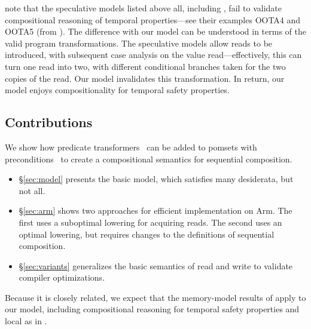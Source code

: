 \citet{DBLP:journals/pacmpl/JagadeesanJR20} note that the speculative models
listed above all, including \cite{DBLP:conf/popl/KangHLVD17}, fail to
validate compositional reasoning of temporal properties---see their examples
OOTA4 and OOTA5 (from \citep{DBLP:journals/toplas/Lochbihler13}).  The
difference with our model can be understood in terms of the valid program
transformations.  The speculative models allow reads to be introduced, with
subsequent case analysis on the value read---effectively, this can turn one
read into two, with different conditional branches taken for the two copies
of the read.  Our model invalidates this transformation.  In return, our
model enjoys compositionality for temporal safety properties.

\subsection{Contributions}

We show how predicate transformers~\cite{DBLP:journals/cacm/Dijkstra75} can
be added to pomsets with
preconditions~\cite{DBLP:journals/pacmpl/JagadeesanJR20} to create a
compositional semantics for sequential composition.
\begin{itemize}
\item \S\ref{sec:model} presents the basic model, which satisfies many
  desiderata, but not all.
\item \S\ref{sec:arm} shows two approaches for efficient implementation on
  Arm.  The first uses a suboptimal lowering for acquiring reads.  The second
  uses an optimal lowering, but requires changes to the definitions of
  sequential composition.
\item \S\ref{sec:variants} generalizes the basic semantics of read and write
  to validate compiler optimizations.
\end{itemize}
Because it is closely related, we expect that the memory-model results of
\cite{DBLP:journals/pacmpl/JagadeesanJR20} apply to our model, including
compositional reasoning for temporal safety properties and {local} \drfsc{}
as in \cite{Dolan:2018:BDR:3192366.3192421,DBLP:conf/ppopp/DongolJR19,promising-ldrf}.
